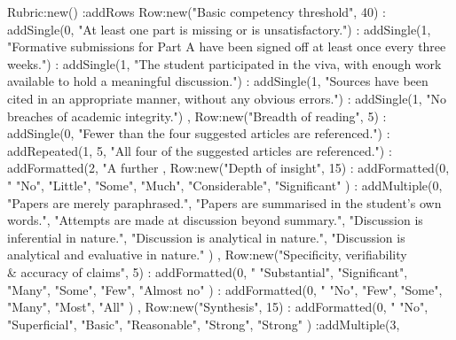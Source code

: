 \documentclass{../../fal_assignment}
\begin{document}
\renewcommand{\refname}{Papers}
\nocite{*}



%

\begin{luacode*}
	Rubric:new()
		:addRows {
			Row:new("Basic competency threshold", 40)
				: addSingle(0, "At least one part is missing or is unsatisfactory.")
				: addSingle(1, "Formative submissions for Part A have been signed off at least once every three weeks.")
				: addSingle(1, "The student participated in the viva, with enough work available to hold a meaningful discussion.")
				: addSingle(1, "Sources have been cited in an appropriate manner, without any obvious errors.")
				: addSingle(1, "No breaches of academic integrity.")
			,
			Row:new("Breadth of reading", 5)
				: addSingle(0, "Fewer than the four suggested articles are referenced.")
				: addRepeated(1, 5, "All four of the suggested articles are referenced.")
				: addFormatted(2, "A further %
			,
			Row:new("Depth of insight", 15)
				: addFormatted(0, "%
					{ "No", "Little", "Some", "Much", "Considerable", "Significant" })
				: addMultiple(0, {
					"Papers are merely paraphrased.",
					"Papers are summarised in the student's own words.",
					"Attempts are made at discussion beyond summary.",
					"Discussion is inferential in nature.",
					"Discussion is analytical in nature.",
					"Discussion is analytical and evaluative in nature." })
			,
			Row:new("Specificity, verifiability \\& accuracy of claims", 5)
				: addFormatted(0, "%
					{ "Substantial", "Significant", "Many", "Some", "Few", "Almost no" })
				: addFormatted(0, "%
					{ "No", "Few", "Some", "Many", "Most", "All" })
			,
			Row:new("Synthesis", 15)
				: addFormatted(0, "%
					{ "No", "Superficial", "Basic", "Reasonable", "Strong", "Strong" })
				:addMultiple(3, {
}}
\end{luacode*}
\end{document}
